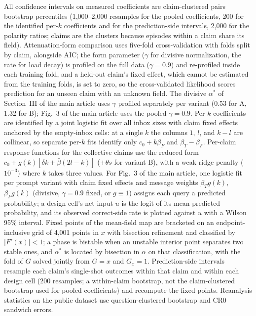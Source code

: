 \documentclass[11pt]{article}
\newcommand{\astar}{\alpha^{*}}
\begin{document}
All confidence intervals on measured coefficients are claim-clustered pairs
bootstrap percentiles (1{,}000--2{,}000 resamples for the pooled
coefficients, 200 for the identified per-$k$ coefficients and for the
prediction-side intervals, 2{,}000 for the polarity ratios; claims are the
clusters because episodes within a claim share its field). Attenuation-form comparison
uses five-fold cross-validation with folds split by claim, alongside AIC; the
form parameter ($\gamma$ for divisive normalization, the rate for load decay)
is profiled on the full data ($\gamma = 0.9$) and re-profiled inside each
training fold, and a held-out claim's fixed effect, which cannot be estimated
from the training folds, is set to zero, so the cross-validated likelihood
scores prediction for an unseen claim with an unknown field. The divisive
$\astar$ of Section~III of the main article uses $\gamma$ profiled separately
per variant (0.53 for A, 1.32 for B); Fig.~3 of the main article uses the pooled
$\gamma = 0.9$. Per-$k$ coefficients are identified by a joint logistic fit
over all inbox sizes with claim fixed effects anchored by the empty-inbox
cells: at a single $k$ the columns $1$, $l$, and $k - l$ are collinear, so
separate per-$k$ fits identify only $c_0 + k\beta_F$ and $\beta_T - \beta_F$.
Per-claim response functions for the collective claims use the reduced form
$c_0 + g(k)[\delta k + \bar\beta(2l - k)]$ ($+\theta s$ for variant B), with
a weak ridge penalty ($10^{-3}$) where $k$ takes three values. For Fig.~3 of the main article, one logistic fit per prompt variant
with claim fixed effects and message weights $\beta_T g(k)$, $\beta_F g(k)$
(divisive, $\gamma = 0.9$ fixed, or $g \equiv 1$) assigns each query a
predicted probability; a design cell's net input $u$ is the logit of its mean
predicted probability, and its observed correct-side rate is plotted against
$u$ with a Wilson 95\% interval. Fixed points of the mean-field map are
bracketed on an endpoint-inclusive grid of 4{,}001 points in $x$ with
bisection refinement and classified by $|F'(x)| < 1$; a phase is bistable
when an unstable interior point separates two stable ones, and $\astar$ is
located by bisection in $\alpha$ on that classification, with the fold of $G$
solved jointly from $G = x$ and $G_x = 1$. Prediction-side intervals resample
each claim's single-shot outcomes within that claim and within each design
cell (200 resamples; a within-claim bootstrap, not the claim-clustered
bootstrap used for pooled coefficients) and recompute the fixed points. Reanalysis statistics on the public dataset use
question-clustered bootstrap and CR0 sandwich errors.
\end{document}

